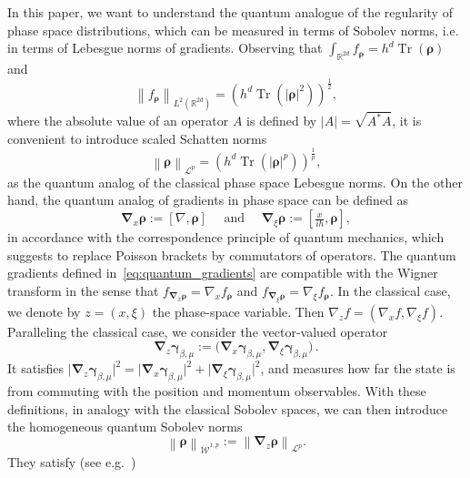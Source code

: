 \documentclass[11pt]{amsart}
\theoremstyle{plain}
\theoremstyle{definition}
\newcommand		{\RR}		{\mathbb R}			%
\newcommand		{\R}		{\RR}
\newcommand		{\Rdd}		{\R^{2d}}
\renewcommand	{\L}		{\mathcal L}		%
\newcommand		{\cW}		{\mathcal W}		%
\newcommand		{\lt}			{\left}				%
\newcommand		{\rt}			{\right}			%
\renewcommand	{\(}			{\lt(}
\renewcommand	{\)}			{\rt)}
\newcommand		{\com}[1]		{\lt[{#1}\rt]}		%
\newcommand		{\n}[1]			{\lt\lvert #1 \rt\rvert}
\newcommand		{\nrm}[1]		{\lt\lVert #1\rt\rVert}
\newcommand		{\Nrm}[2]		{\nrm{#1}_{#2}}
\newcommand			{\Dx}		{\nabla_x}
\newcommand			{\Dv}		{\nabla_\xi}
\DeclareMathOperator{\tr}		{Tr}				%
\newcommand		{\Tr}[1]		{\tr\!\( #1 \)}		%
\newcommand		{\intdd}		{\int_{\Rdd}}
\newcommand		{\hd}		{h^d}
\newcommand		{\op}		{{\boldsymbol{\rho}}}%
\newcommand		{\opgam}	{{\boldsymbol{\gamma}}}	%
\newcommand		{\Dh}		{\boldsymbol{\nabla}}	%
\newcommand		{\Dhx}[1]	{\Dh_{\!x} #1}			%
\newcommand		{\Dhv}[1]	{\Dh_{\!\xi} #1}		%
\newcommand		{\Dhz}[1]	{\Dh_{\!z} #1}
\begin{document}
	In this paper, we want to understand the quantum analogue of the regularity of phase space distributions, which can be measured in terms of Sobolev norms, i.e. in terms of Lebesgue norms of gradients. Observing that $\intdd f_{\op} = \hd\Tr{\op}$ and
	\begin{equation}\label{eq:L2_norm}
		\Nrm{f_{\op}}{L^2(\Rdd)} = \lt(\hd\Tr{\n{\op}^2}\rt)^\frac{1}{2} ,
	\end{equation}
	where the absolute value of an operator $A$ is defined by $\n{A} = \sqrt{A^*A}$, it is convenient to introduce scaled Schatten norms 
	\begin{equation}\label{eq:def_norm}
		\Nrm{\op}{\L^p} = \lt(\hd\Tr{\n{\op}^p}\rt)^\frac{1}{p},
	\end{equation}
	as the quantum analog of the classical phase space Lebesgue norms. On the other hand, the quantum analog of gradients in phase space can be defined as
	\begin{equation}\label{eq:quantum_gradients}
		\Dhx \op := \com{\nabla,\op} \quad \text{ and } \quad
		\Dhv \op := \com{\tfrac{x}{i\hbar},\op} ,
	\end{equation}
    in accordance with the correspondence principle of quantum mechanics, which suggests to replace Poisson brackets by commutators of operators.
	The quantum gradients defined in~\eqref{eq:quantum_gradients} are compatible with the Wigner transform in the sense that $f_{\Dhx\op} = \Dx f_\op$ and $f_{\Dhv\op} = \Dv f_\op$. In the classical case, we denote by $z = (x,\xi)$ the phase-space variable. Then $\nabla_z f = (\Dx f,\Dv f)$. Paralleling the classical case, we consider the vector-valued operator
	\begin{equation*}
		\Dhz \opgam_{\beta, \mu} := \bigl(\Dhx \opgam_{\beta, \mu}, \Dhv\opgam_{\beta, \mu}\bigr) \, .
	\end{equation*}
	It satisfies $\lvert\Dhz \opgam_{\beta, \mu}\rvert^2 = \lvert\Dhx \opgam_{\beta, \mu}\rvert^2 + \lvert \Dhv \opgam_{\beta, \mu} \rvert^2$, and measures how far the state is from commuting with the position and momentum observables. With these definitions, in analogy with the classical Sobolev spaces, we can then introduce the homogeneous quantum Sobolev norms
	\begin{equation}\label{eq:quantum_Sobolev}
		\Nrm{\op}{\dot{\cW}^{1,p}} := \Nrm{\Dhz\op}{\L^p} .
	\end{equation}
	They satisfy (see e.g.~\cite[Proposition~A.2]{lafleche_quantum_2024})
\end{document}
